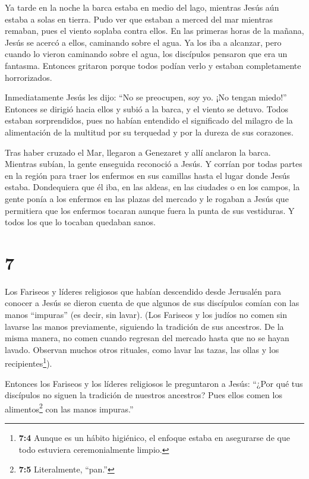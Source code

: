  Ya tarde en la noche la barca estaba en medio del lago,
mientras Jesús aún estaba a solas en tierra.  Pudo ver que
estaban a merced del mar mientras remaban, pues el viento soplaba contra
ellos. En las primeras horas de la mañana, Jesús se acercó a ellos,
caminando sobre el agua. Ya los iba a alcanzar,  pero
cuando lo vieron caminando sobre el agua, los discípulos pensaron que
era un fantasma. Entonces gritaron  porque todos podían
verlo y estaban completamente horrorizados.

Inmediatamente Jesús les dijo: ``No se preocupen, soy yo. ¡No tengan
miedo!''  Entonces se dirigió hacia ellos y subió a la
barca, y el viento se detuvo. Todos estaban sorprendidos, 
pues no habían entendido el significado del milagro de la alimentación
de la multitud por su terquedad y por la dureza de sus corazones.

 Tras haber cruzado el Mar, llegaron a Genezaret y allí
anclaron la barca.  Mientras subían, la gente enseguida
reconoció a Jesús.  Y corrían por todas partes en la región
para traer los enfermos en sus camillas hasta el lugar donde Jesús
estaba.  Dondequiera que él iba, en las aldeas, en las
ciudades o en los campos, la gente ponía a los enfermos en las plazas
del mercado y le rogaban a Jesús que permitiera que los enfermos tocaran
aunque fuera la punta de sus vestiduras. Y todos los que lo tocaban
quedaban sanos.

\hypertarget{section-6}{%
\section{7}\label{section-6}}

 Los Fariseos y líderes religiosos que habían descendido
desde Jerusalén para conocer a Jesús  se dieron cuenta de
que algunos de sus discípulos comían con las manos ``impuras'' (es
decir, sin lavar).  (Los Fariseos y los judíos no comen sin
lavarse las manos previamente, siguiendo la tradición de sus ancestros.
 De la misma manera, no comen cuando regresan del mercado
hasta que no se hayan lavado. Observan muchos otros rituales, como lavar
las tazas, las ollas y los recipientes\footnote{\textbf{7:4} Aunque es
  un hábito higiénico, el enfoque estaba en asegurarse de que todo
  estuviera ceremonialmente limpio.}).

 Entonces los Fariseos y los líderes religiosos le
preguntaron a Jesús: ``¿Por qué tus discípulos no siguen la tradición de
nuestros ancestros? Pues ellos comen los alimentos\footnote{\textbf{7:5}
  Literalmente, ``pan.''} con las manos impuras.''

